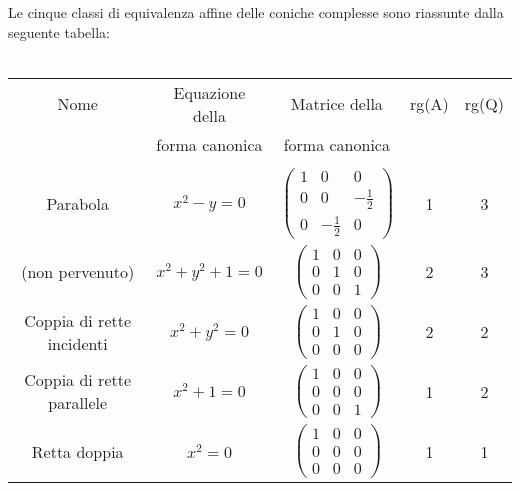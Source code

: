  Le cinque classi di equivalenza affine delle coniche complesse sono riassunte dalla seguente tabella:\\
 \vspace{5mm}\\
 \begin{tabular}{|c|c|c|c|c|}
 \hline
  Nome & Equazione della & Matrice della & rg(A) & rg(Q)\\
   &  forma canonica & forma canonica & & \\
  \hline
  & & & & \\
  Parabola & $x^2-y=0$ & $\left(\begin{smallmatrix} 1 & 0 & 0 \\ 0 & 0 & -\frac{1}{2}\\ 0 & -\frac{1}{2} & 0 \end{smallmatrix}\right)$ & 1 & 3 \\
  (non pervenuto) & $x^2+y^2+1=0$ & $\left(\begin{smallmatrix} 1 & 0 & 0 \\ 0 & 1 & 0 \\ 0 & 0 & 1 \end{smallmatrix}\right)$ & 2 & 3 \\
  Coppia di rette incidenti & $x^2+y^2=0$ & $\left(\begin{smallmatrix} 1 & 0 & 0 \\ 0 & 1 & 0 \\ 0 & 0 & 0 \end{smallmatrix}\right)$ & 2 & 2 \\
  Coppia di rette parallele & $x^2+1=0$ & $\left(\begin{smallmatrix} 1 & 0 & 0 \\ 0 & 0 & 0 \\ 0 & 0 & 1 \end{smallmatrix}\right)$ & 1 & 2 \\
  Retta doppia & $x^2=0$ & $\left(\begin{smallmatrix} 1 & 0 & 0 \\ 0 & 0 & 0 \\ 0 & 0 & 0 \end{smallmatrix}\right)$ & 1 & 1 \\
  \hline
 \end{tabular}
 
